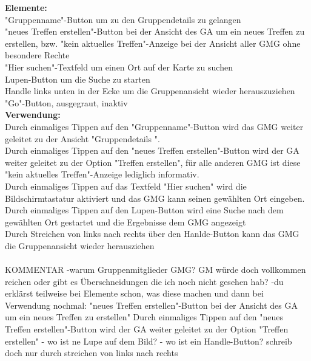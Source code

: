 \textbf{Elemente:}\\
"Gruppenname"-Button um zu den Gruppendetails zu gelangen\\
"neues Treffen erstellen"-Button bei der Ansicht des GA um ein neues Treffen zu erstellen, bzw. "kein aktuelles Treffen"-Anzeige bei der Ansicht aller GMG ohne besondere Rechte\\
"Hier suchen"-Textfeld um einen Ort auf der Karte zu suchen\\
Lupen-Button um die Suche zu starten\\
Handle links unten in der Ecke um die Gruppenansicht wieder herauszuziehen\\
"Go"-Button, ausgegraut, inaktiv\\
\textbf{Verwendung:}\\
Durch einmaliges Tippen auf den "Gruppenname"-Button wird das GMG weiter geleitet zu der Ansicht "Gruppendetails ".\\
Durch einmaliges Tippen auf den "neues Treffen erstellen"-Button wird der GA weiter geleitet zu der Option "Treffen erstellen", für alle anderen GMG ist diese "kein aktuelles Treffen"-Anzeige lediglich informativ.\\
Durch einmaliges Tippen auf das Textfeld "Hier suchen" wird die Bildschirmtastatur aktiviert und das GMG kann seinen gewählten Ort eingeben.\\
Durch einmaliges Tippen auf den Lupen-Button wird eine Suche nach dem gewählten Ort gestartet und die Ergebnisse dem GMG angezeigt\\
Durch Streichen von links nach rechts über den Hanlde-Button kann das GMG die Gruppenansicht wieder herausziehen\\ \\

KOMMENTAR
-warum Gruppenmitglieder GMG? GM würde doch vollkommen reichen oder gibt es Überschneidungen die ich noch nicht gesehen hab?
-du erklärst teilweise bei Elemente schon, was diese machen und dann bei Verwendung nochmal: "neues Treffen erstellen"-Button bei der Ansicht des GA um ein neues Treffen zu erstellen"
Durch einmaliges Tippen auf den "neues Treffen erstellen"-Button wird der GA weiter geleitet zu der Option "Treffen erstellen"
- wo ist ne Lupe auf dem Bild?
- wo ist ein Handle-Button? schreib doch nur durch streichen von links nach rechts

